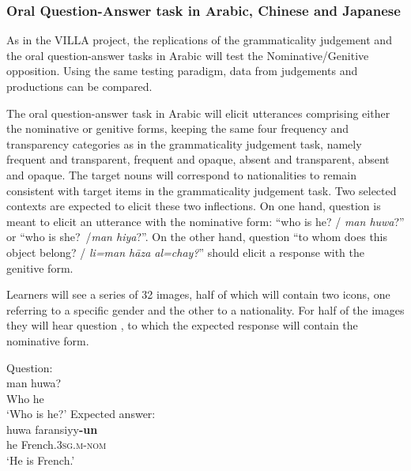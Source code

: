 \documentclass[output=paper,colorlinks,citecolor=brown,modfonts,nonflat]{../langscibook}
\begin{document}
\subsubsection{Oral Question-Answer task in Arabic, Chinese and Japanese}\label{sec:watorek:4.2.3}

\label{sec:watorek:4.2.3.1}

As in the VILLA project, the replications of the grammaticality judgement and the oral question-answer tasks in Arabic will test the Nominative/Genitive opposition. Using the same testing paradigm, data from judgements and productions can be compared.

The oral question-answer task in Arabic will elicit utterances comprising either the nominative or genitive forms, keeping the same four frequency and transparency categories as in the grammaticality judgement task, namely frequent and transparent, frequent and opaque, absent and transparent, absent and opaque. The target nouns will correspond to nationalities to remain consistent with target items in the grammaticality judgement task. Two selected contexts are expected to elicit these two inflections. On one hand, question  is meant to elicit an utterance with the nominative form: “who is he? / \textit{man huwa}?”  or “who is she?~/\textit{man hiya}?”. On the other hand, question  “to whom does this object belong? / \textit{li=man hāza al=chay?}” should elicit a response with the genitive form.

Learners will see a series of 32 images, half of which will contain two icons, one referring to a specific gender and the other to a nationality. For half of the images they will hear question   %
, to which the expected response will contain the nominative form.

\ea%
    \label{ex:watorek:18}
    \ea%
        \label{ex:watorek:18a}
        \ea
            Question: \\
            \gll    man huwa?\\
                    Who  he\\
            \glt    ‘Who is he?’
        \ex%
        \label{ex:watorek:18b}
            Expected answer:\\
            \gll     huwa faransiyy\textbf{{-un}}\\
                    he French\textsc{.3sg.m{-nom}}\\
            \glt    ‘He is French.’
        \z
        \ex \label{ex:watorek:18c}
        \ea%
\end{document}
